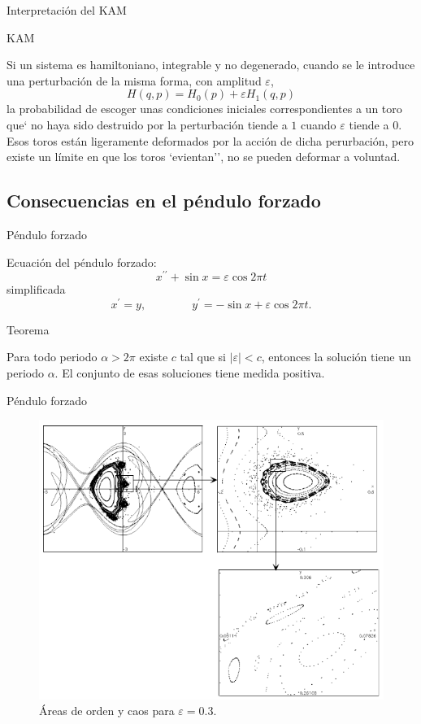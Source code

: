 \documentclass[8pt]{beamer}
\renewcommand{\>}{\rangle}
\newcommand{\<}{\langle}
\newcommand{\be}{\begin{equation}}
\newcommand{\ee}{\end{equation}}
\begin{document}
\begin{frame}{Interpretación del KAM}

\begin{mygreenbox}{KAM}

Si un sistema es hamiltoniano, integrable y no degenerado, cuando se le introduce una perturbación de la misma forma, con amplitud $\varepsilon$,
\be 
	H(q,p) = H_{0}(p) + \varepsilon H_{1}(q,p) \nonumber
\ee
la probabilidad de escoger unas condiciones iniciales correspondientes a un toro que` no haya sido destruido por la perturbación tiende a $1$ cuando $\varepsilon$ tiende a $0$. Esos toros están ligeramente deformados por la acción de dicha perurbación, pero existe un límite en que los toros `evientan'', no se pueden deformar a voluntad.

\end{mygreenbox}

\end{frame}

\subsection[Consecuencias en el péndulo forzado]{Consecuencias en el péndulo forzado}

\begin{frame}{Péndulo forzado}

Ecuación del péndulo forzado:
\be 
	x^{\prime \prime} +\sin x = \varepsilon \cos 2\pi t \nonumber
\ee
simplificada
\be 
	x^{\prime} = y, \qquad \qquad
	y^{\prime} = - \sin x + \varepsilon \cos 2\pi t.
	\nonumber
\ee
\vspace{0.5cm}

\begin{mybox}{Teorema}

Para todo periodo $\alpha > 2\pi$ existe $c$ tal que si $|\varepsilon| < c$, entonces la solución tiene un periodo $\alpha$. El conjunto de esas soluciones tiene medida positiva.  

\end{mybox}

\end{frame}

\begin{frame}{Péndulo forzado}

\begin{figure}[h]
\centering
\includegraphics[scale=0.4]{pendulo.png}
\caption{Áreas de orden y caos para $\varepsilon=0.3$.}
\end{figure}

\end{frame}
\end{document}
